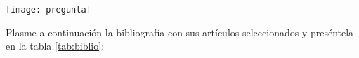 \begin{marginfigure}[1.2cm]%
	\texttt{[image: pregunta]}
\end{marginfigure}

\begin{kaobox}[frametitle=Ejercicio]
	Plasme a continuación la bibliografía con sus artículos seleccionados y preséntela en la tabla \ref{tab:biblio}:
\end{kaobox}

 
